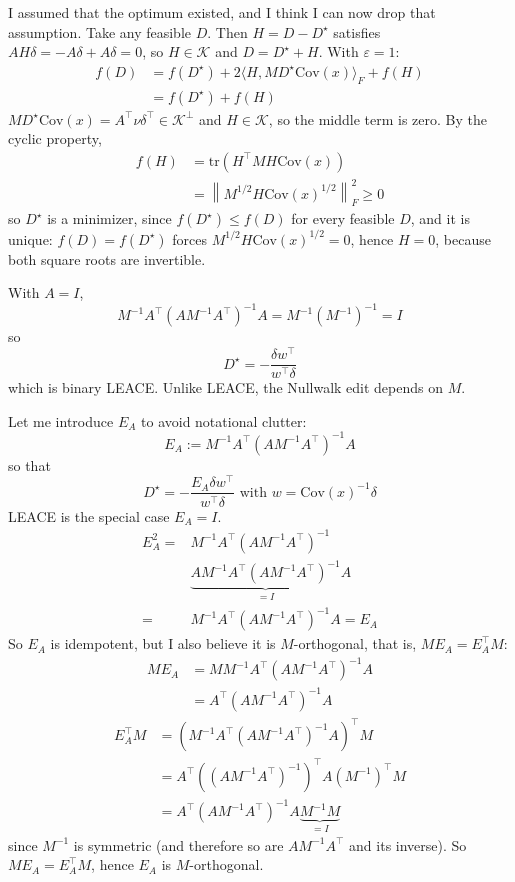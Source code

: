 \documentclass[10pt,a4paper,twocolumn]{article}
\begin{document}
	I assumed that the optimum existed, and I think I can now drop that assumption. Take any feasible $D$. Then $H = D - D^\star$ satisfies $A H \delta = - A \delta + A \delta = 0$, so $H \in \mathcal{K}$ and $D = D^\star + H$. With $\varepsilon = 1$:
	$$\begin{aligned}
		f(D) & = f(D^\star) + 2 \langle H, M D^\star \mathrm{Cov}(x) \rangle_F + f(H) \\
		& = f(D^\star) + f(H)
	\end{aligned}$$
	$M D^\star \mathrm{Cov}(x) = A^\top \nu \delta^\top \in \mathcal{K}^\perp$ and $H \in \mathcal{K}$, so the middle term is zero. By the cyclic property,
	$$\begin{aligned}
		f(H) & = \mathrm{tr} \left( H^\top M H \mathrm{Cov}(x) \right) \\
		& = \left\| M^{1/2} H \mathrm{Cov}(x)^{1/2} \right\|_F^2 \ge 0
	\end{aligned}$$
	so $D^\star$ is a minimizer, since $f(D^\star) \le f(D)$ for every feasible $D$, and it is unique: $f(D) = f(D^\star)$ forces $M^{1/2} H \mathrm{Cov}(x)^{1/2} = 0$, hence $H = 0$, because both square roots are invertible.

	With $A = I$,
	$$M^{-1} A^\top (A M^{-1} A^\top)^{-1} A = M^{-1} (M^{-1})^{-1} = I$$
	so
	$$D^\star = - \frac{\delta w^\top}{w^\top \delta}$$
	which is binary LEACE. Unlike LEACE, the Nullwalk edit depends on $M$.

	Let me introduce $E_A$ to avoid notational clutter:
	$$E_A := M^{-1} A^\top (A M^{-1} A^\top)^{-1} A$$
	so that
	$$D^\star = - \frac{E_A \delta w^\top}{w^\top \delta} \text{ with } w = \mathrm{Cov}(x)^{-1} \delta$$
	LEACE is the special case $E_A = I$.
	$$\begin{aligned}
		E_A^2 = {} & M^{-1} A^\top (A M^{-1} A^\top)^{-1} \\
		& \underbrace{A M^{-1} A^\top (A M^{-1} A^\top)^{-1}}_{= I} A \\
		= {} & M^{-1} A^\top (A M^{-1} A^\top)^{-1} A = E_A
	\end{aligned}$$
	So $E_A$ is idempotent, but I also believe it is $M$-orthogonal, that is, $M E_A = E_A^\top M$:
	$$\begin{aligned}
		M E_A & = M M^{-1} A^\top (A M^{-1} A^\top)^{-1} A \\
		& = A^\top (A M^{-1} A^\top)^{-1} A
	\end{aligned}$$
	$$\begin{aligned}
		E_A^\top M & = \left( M^{-1} A^\top (A M^{-1} A^\top)^{-1} A \right)^\top M \\
		& = A^\top \left( (A M^{-1} A^\top)^{-1} \right)^\top A (M^{-1})^\top M \\
		& = A^\top (A M^{-1} A^\top)^{-1} A \underbrace{M^{-1} M}_{= I}
	\end{aligned}$$
	since $M^{-1}$ is symmetric (and therefore so are $A M^{-1} A^\top$ and its inverse). So $M E_A = E_A^\top M$, hence $E_A$ is $M$-orthogonal.
\end{document}
